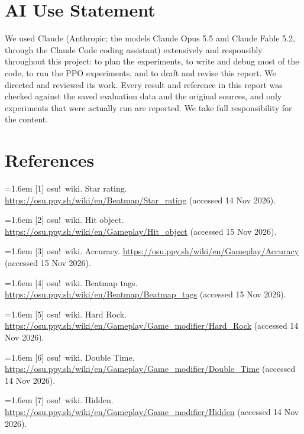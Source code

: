 \documentclass[10pt,a4paper]{article}
\begin{document}
\section{AI Use Statement}

We used Claude (Anthropic; the models Claude Opus 5.5 and Claude Fable 5.2, through the Claude Code coding assistant) extensively and responsibly throughout this project: to plan the experiments, to write and debug most of the code, to run the PPO experiments, and to draft and revise this report. We directed and reviewed its work. Every result and reference in this report was checked against the saved evaluation data and the original sources, and only experiments that were actually run are reported. We take full responsibility for the content.


\newpage{}

\section*{References}

{\hangindent=1.6em [1] osu!\ wiki. Star rating. \url{https://osu.ppy.sh/wiki/en/Beatmap/Star_rating} (accessed 14 Nov 2026).\par}

{\hangindent=1.6em [2] osu!\ wiki. Hit object. \url{https://osu.ppy.sh/wiki/en/Gameplay/Hit_object} (accessed 15 Nov 2026).\par}

{\hangindent=1.6em [3] osu!\ wiki. Accuracy. \url{https://osu.ppy.sh/wiki/en/Gameplay/Accuracy} (accessed 15 Nov 2026).\par}

{\hangindent=1.6em [4] osu!\ wiki. Beatmap tags. \url{https://osu.ppy.sh/wiki/en/Beatmap/Beatmap_tags} (accessed 15 Nov 2026).\par}

{\hangindent=1.6em [5] osu!\ wiki. Hard Rock. \url{https://osu.ppy.sh/wiki/en/Gameplay/Game_modifier/Hard_Rock} (accessed 14 Nov 2026).\par}

{\hangindent=1.6em [6] osu!\ wiki. Double Time. \url{https://osu.ppy.sh/wiki/en/Gameplay/Game_modifier/Double_Time} (accessed 14 Nov 2026).\par}

{\hangindent=1.6em [7] osu!\ wiki. Hidden. \url{https://osu.ppy.sh/wiki/en/Gameplay/Game_modifier/Hidden} (accessed 14 Nov 2026).\par}
\end{document}
